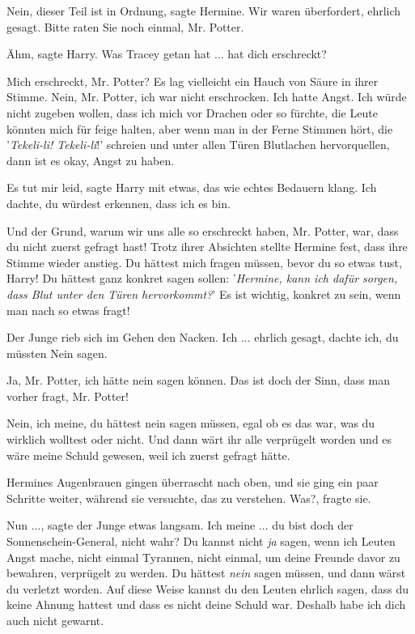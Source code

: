 \glqq{}Nein, dieser Teil ist in Ordnung\grqq{}, sagte Hermine. \glqq{}Wir waren
überfordert, ehrlich gesagt. Bitte raten Sie noch einmal, Mr. Potter.\grqq{}

\glqq{}Ähm\grqq{}, sagte Harry. \glqq{}Was Tracey getan hat ... hat dich
erschreckt?\grqq{}

\glqq{}Mich erschreckt, Mr. Potter?\grqq{} Es lag vielleicht ein Hauch von Säure
in ihrer Stimme. \glqq{}Nein, Mr. Potter, ich war nicht erschrocken. Ich hatte
Angst. Ich würde nicht zugeben wollen, dass ich mich vor Drachen oder so
fürchte, die Leute könnten mich für feige halten, aber wenn man in der Ferne
Stimmen hört, die '\emph{Tekeli-li! Tekeli-li}!' schreien und unter allen Türen
Blutlachen hervorquellen, dann ist es okay, Angst zu haben.\grqq{}

\glqq{}Es tut mir leid\grqq{}, sagte Harry mit etwas, das wie echtes Bedauern
klang. \glqq{}Ich dachte, du würdest erkennen, dass ich es bin.\grqq{}

\glqq{}Und der Grund, warum wir uns alle so erschreckt haben, Mr. Potter, war,
dass du nicht zuerst gefragt hast!\grqq{} Trotz ihrer Absichten stellte Hermine
fest, dass ihre Stimme wieder anstieg. \glqq{}Du hättest mich fragen müssen,
bevor du so etwas tust, Harry! Du hättest ganz konkret sagen sollen:
'\emph{Hermine, kann ich dafür sorgen, dass Blut unter den Türen hervorkommt?}'
Es ist wichtig, konkret zu sein, wenn man nach so etwas fragt!\grqq{}

Der Junge rieb sich im Gehen den Nacken. \glqq{}Ich ... ehrlich gesagt, dachte
ich, du müssten Nein sagen.\grqq{}

\glqq{}Ja, Mr. Potter, ich hätte nein sagen können. Das ist doch der Sinn, dass
man vorher fragt, Mr. Potter!\grqq{}

\glqq{}Nein, ich meine, du hättest nein sagen müssen, egal ob es das war, was du
wirklich wolltest oder nicht. Und dann wärt ihr alle verprügelt worden und es
wäre meine Schuld gewesen, weil ich zuerst gefragt hätte.\grqq{}

Hermines Augenbrauen gingen überrascht nach oben, und sie ging ein paar Schritte
weiter, während sie versuchte, das zu verstehen. \glqq{}Was?\grqq{}, fragte sie.

\glqq{}Nun ...\grqq{}, sagte der Junge etwas langsam. \glqq{}Ich meine ... du bist
doch der Sonnenschein-General, nicht wahr? Du kannst nicht \emph{ja} sagen, wenn
ich Leuten Angst mache, nicht einmal Tyrannen, nicht einmal, um deine Freunde
davor zu bewahren, verprügelt zu werden. Du hättest \emph{nein} sagen müssen,
und dann wärst du verletzt worden. Auf diese Weise kannst du den Leuten ehrlich
sagen, dass du keine Ahnung hattest und dass es nicht deine Schuld war. Deshalb
habe ich dich auch nicht gewarnt.\grqq{}

